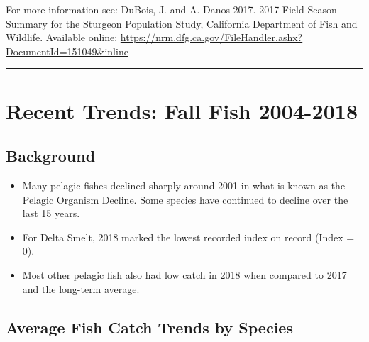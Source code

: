 \documentclass[
]{book}
\providecommand{\tightlist}{%
  \setlength{\itemsep}{0pt}\setlength{\parskip}{0pt}}
\begin{document}
\begin{disclaimer}
For more information see: DuBois, J. and A. Danos 2017. 2017 Field
Season Summary for the Sturgeon Population Study, California Department
of Fish and Wildlife. Available online:
\url{https://nrm.dfg.ca.gov/FileHandler.ashx?DocumentId=151049\&inline}
\end{disclaimer}

\begin{center}\rule{0.5\linewidth}{0.5pt}\end{center}

\hypertarget{recent-trends-fall-fish-2004-2018}{%
\section{Recent Trends: Fall Fish 2004-2018}\label{recent-trends-fall-fish-2004-2018}}

\hypertarget{background-5}{%
\subsection{Background}\label{background-5}}

\begin{itemize}
\tightlist
\item
  Many pelagic fishes declined sharply around 2001 in what is known as the Pelagic Organism Decline. Some species have continued to decline over the last 15 years.
\item
  For Delta Smelt, 2018 marked the lowest recorded index on record (Index = 0).
\item
  Most other pelagic fish also had low catch in 2018 when compared to 2017 and the long-term average.
\end{itemize}

\hypertarget{average-fish-catch-trends-by-species-1}{%
\subsection{Average Fish Catch Trends by Species}\label{average-fish-catch-trends-by-species-1}}
\end{document}

